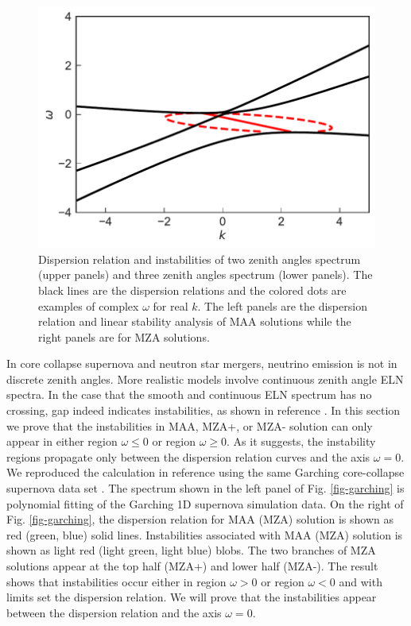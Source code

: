 \begin{figure}[!htb]
\endminipage\hfill
{}
  \includegraphics[width=\linewidth]{chapters/assets/dr/spectDB3WC4DRDBMZAPltBlob.pdf}
\endminipage\hfill
\caption{Dispersion relation and instabilities of two zenith angles spectrum (upper panels) and three zenith angles spectrum (lower panels). The black lines are the dispersion relations and the colored dots are examples of complex $\omega$ for real $k$. The left panels are the dispersion relation and linear stability analysis of MAA solutions while the right panels are for MZA solutions.}
\label{fig-dr-db}
\end{figure}



In core collapse supernova and neutron star mergers, neutrino emission is not in discrete zenith angles. More realistic models involve continuous zenith angle ELN spectra. In the case that the smooth and continuous ELN spectrum has no crossing, gap indeed indicates instabilities, as shown in reference \cite{Izaguirre2016a}. In this section we prove that the instabilities in MAA, MZA+, or MZA- solution can only appear in either region $\omega\leq 0$ or region $\omega \geq 0$. As it suggests, the instability regions propagate only between the dispersion relation curves and the axis $\omega=0$. We reproduced the calculation in reference \cite{Izaguirre2016a} using the same Garching core-collapse supernova data set \cite{garching-ccsn-data}. The spectrum shown in the left panel of Fig. \ref{fig-garching} is polynomial fitting of the Garching 1D supernova simulation data. On the right of Fig. \ref{fig-garching}, the dispersion relation for MAA (MZA) solution is shown as red (green, blue) solid lines. Instabilities associated with MAA (MZA) solution is shown as light red (light green, light blue) blobs. The two branches of MZA solutions appear at the top half (MZA+) and lower half (MZA-). The result shows that instabilities occur either in region $\omega>0$ or region $\omega<0$ and with limits set the dispersion relation. We will prove that the instabilities appear between the dispersion relation and the axis $\omega=0$.






